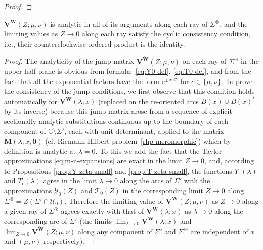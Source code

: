 \documentclass[12pt]{amsart}
\numberwithin{equation}{section}
\newcommand{\ee}{\mathrm{e}}
\newcommand{\ii}{\mathrm{i}}
\newcommand{\SP}{\lambda}
\newcommand{\C}{\mathbb{C}}
\newcommand{\eps}{\epsilon}
\begin{document}
\begin{proof}
\end{proof}

\begin{lem}
	$\mathbf{V}^{\breve{\mathbf{W}}}(Z;\mu,\nu)$ is analytic in all of its arguments along each ray of $\Sigma^\circledast$, and the limiting values as $Z \to 0$ along each ray satisfy the cyclic consistency condition, i.e., their counterclockwise-ordered product is the identity.
\label{lem:W0-consistency}	
\end{lem}

\begin{proof}
The analyticity of the jump matrix $\mathbf{V}^{\breve{\mathbf{W}}}(Z;\mu,\nu)$ on each ray of $\Sigma^\circledast$ in the upper half-plane is obvious from formul\ae\
\eqref{eq:Y0-def}, \eqref{eq:T0-def}, and from the fact that all the exponential factors have the form $\ee^{\pm \ii c Z^2}$ for $c \in \{\mu,\nu\}$. 
To prove the consistency of the jump conditions, we first observe that this condition holds automatically for $\mathbf{V^W}(\SP;x)$ (replaced on the re-oriented arcs $B(x)\cup B(x)^*$ by its inverse) because this jump matrix arose from a sequence of explicit sectionally analytic substitutions continuous up to the boundary of each component of $\C \setminus \Sigma'$, each with unit determinant, applied to the matrix $\widetilde{\mathbf{M}}(\SP;x,\mathbf{0})$ (cf. Riemann-Hilbert problem~\ref{rhp-meromorphic}) which by definition is analytic at $\SP =0$. To this we add the fact that the Taylor approximations \eqref{eq:m-n-expansions} are exact in the limit $Z \to 0$, and, according to Propositions \ref{prop:Y-zeta-small} and \ref{prop:T-zeta-small}, the functions $Y_\eps(\SP)$ and $T_\eps(\SP)$ agree in the limit $\SP \to 0$ along the arcs of $\Sigma'$ with the approximations $\mathcal{Y}_0(Z)$ and $\mathcal{T}_0(Z)$ in the corresponding limit $Z \to 0$ along $\Sigma^\circledast =Z (\Sigma' \cap \mathcal{U}_0)$. Therefore the limiting value of $\mathbf{V}^{\breve{\mathbf{W}}}(Z;\mu, \nu)$ as $Z \to 0$ along a given ray of $\Sigma^\circledast$ agrees exactly with that of $\mathbf{V^W}(\SP;x)$ as $\SP \to 0$ along the corresponding arc of $\Sigma'$ (the limits $\lim_{\SP \to 0} \mathbf{V^W}(\SP;x)$ and $\lim_{Z \to 0} \mathbf{V}^{\breve{\mathbf{W}}}(Z;\mu,\nu)$ along any component of $\Sigma'$ and $\Sigma^\circledast$ are independent of $x$ and $(\mu,\nu)$ respectively). 
\end{proof}
\end{document}
